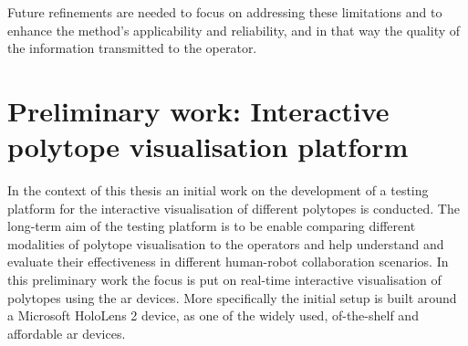 Future refinements are needed to focus on addressing these limitations and to enhance the method's applicability and reliability, and in that way the quality of the information transmitted to the operator.




\section{Preliminary work: Interactive polytope visualisation platform}
\label{ch:claire}


In the context of this thesis an initial work on the development of a testing platform for the interactive visualisation of different polytopes is conducted.
The long-term aim of the testing platform is to be enable comparing different modalities of polytope visualisation to the operators and help understand and evaluate their effectiveness in different human-robot collaboration scenarios. In this preliminary work the focus is put on real-time interactive visualisation of polytopes using the \gls{ar} devices. More specifically the initial setup is built around a Microsoft HoloLens 2 device, as one of the widely used, of-the-shelf and affordable \gls{ar} devices.



